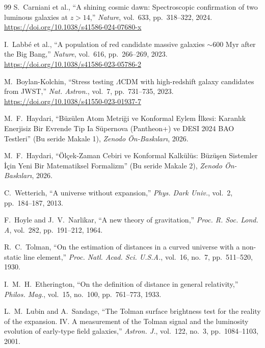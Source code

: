 \documentclass[11pt,a4paper]{article}
\begin{document}
\begin{thebibliography}{99}
    S.~Carniani et al., ``A shining cosmic dawn: Spectroscopic confirmation of two luminous galaxies at $z > 14$,'' \textit{Nature}, vol.~633, pp.~318--322, 2024. \url{https://doi.org/10.1038/s41586-024-07680-x}

    I.~Labb\'e et al., ``A population of red candidate massive galaxies $\sim 600\text{ Myr}$ after the Big Bang,'' \textit{Nature}, vol.~616, pp.~266--269, 2023. \url{https://doi.org/10.1038/s41586-023-05786-2}

    M.~Boylan-Kolchin, ``Stress testing $\Lambda$CDM with high-redshift galaxy candidates from JWST,'' \textit{Nat. Astron.}, vol.~7, pp.~731--735, 2023. \url{https://doi.org/10.1038/s41550-023-01937-7}

    M.~F.~Haydari, ``Büzülen Atom Metriği ve Konformal Eylem İlkesi: Karanlık Enerjisiz Bir Evrende Tip Ia Süpernova (Pantheon+) ve DESI 2024 BAO Testleri'' (Bu seride Makale 1), \textit{Zenodo Ön-Baskıları}, 2026.

    M.~F.~Haydari, ``Ölçek-Zaman Cebiri ve Konformal Kalkülüs: Büzüşen Sistemler İçin Yeni Bir Matematiksel Formalizm'' (Bu seride Makale 2), \textit{Zenodo Ön-Baskıları}, 2026.

    C.~Wetterich, ``A universe without expansion,'' \textit{Phys. Dark Univ.}, vol.~2, pp.~184--187, 2013.

    F.~Hoyle and J.~V.~Narlikar, ``A new theory of gravitation,'' \textit{Proc. R. Soc. Lond. A}, vol.~282, pp.~191--212, 1964.

    R.~C.~Tolman, ``On the estimation of distances in a curved universe with a non-static line element,'' \textit{Proc. Natl. Acad. Sci. U.S.A.}, vol.~16, no.~7, pp.~511--520, 1930.

    I.~M.~H.~Etherington, ``On the definition of distance in general relativity,'' \textit{Philos. Mag.}, vol.~15, no.~100, pp.~761--773, 1933.

    L.~M.~Lubin and A.~Sandage, ``The Tolman surface brightness test for the reality of the expansion. IV. A measurement of the Tolman signal and the luminosity evolution of early-type field galaxies,'' \textit{Astron. J.}, vol.~122, no.~3, pp.~1084--1103, 2001.
\end{thebibliography}
\end{document}
